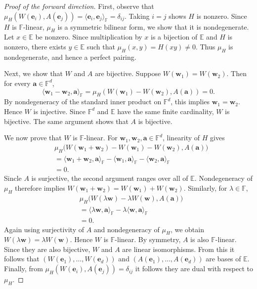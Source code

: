 \documentclass[11pt,letterpaper,usenames,dvipsnames]{article}
\begin{document}
\begin{proof}[Proof of the forward direction]
First, observe that $
\mu_H(W(\mathbf e_i),A(\mathbf e_j))
= \langle \mathbf e_i,\mathbf e_j\rangle_{\mathbb F}
= \delta_{ij}
$. Taking $i=j$ shows $H$ is nonzero. Since $H$ is $\mathbb{F}$-linear, $\mu_H$ is a symmetric bilinear form, we show that it is nondegenerate. Let $x\in\mathbb E$ be nonzero. Since multiplication by $x$ is a bijection of $\mathbb E$ and $H$ is nonzero, there exists $y\in\mathbb E$ such that $\mu_H(x,y)=H(xy)\neq 0$. Thus $\mu_H$ is nondegenerate, and hence a perfect pairing.

Next, we show that $W$ and $A$ are bijective. Suppose
$W(\mathbf w_1)=W(\mathbf w_2)$. Then for every
$\mathbf a\in\mathbb F^d$,
\[
\langle \mathbf w_1-\mathbf w_2,\mathbf a\rangle_{\mathbb F}
= \mu_H(W(\mathbf w_1) - W(\mathbf w_2), A(\mathbf a))
=0.
\]
By nondegeneracy of the standard inner product on $\mathbb F^d$, this
implies $\mathbf w_1=\mathbf w_2$. Hence $W$ is injective. Since
$\mathbb F^d$ and $\mathbb E$ have the same finite cardinality, $W$ is
bijective. The same argument shows that $A$ is bijective.

We now prove that $W$ is $\mathbb F$-linear. For
$\mathbf w_1,\mathbf w_2,\mathbf a\in\mathbb F^d$, linearity of $H$
gives
\[
\begin{aligned}
&\mu_H\bigl(
W(\mathbf w_1+\mathbf w_2)-W(\mathbf w_1)-W(\mathbf w_2),
A(\mathbf a)
\bigr)\\
&=
\langle \mathbf w_1+\mathbf w_2,\mathbf a\rangle_{\mathbb F}
-
\langle \mathbf w_1,\mathbf a\rangle_{\mathbb F}
-
\langle \mathbf w_2,\mathbf a\rangle_{\mathbb F}\\
&=0.
\end{aligned}
\]
Sincle $A$ is surjective, the second argument ranges over all of
$\mathbb E$. Nondegeneracy of $\mu_H$ therefore implies
$W(\mathbf w_1+\mathbf w_2) = W(\mathbf w_1)+W(\mathbf w_2)$. Similarly, for $\lambda\in\mathbb F$,
\[
\begin{aligned}
&\mu_H\bigl(
W(\lambda\mathbf w)-\lambda W(\mathbf w),
A(\mathbf a)
\bigr)\\
&=
\langle \lambda\mathbf w,\mathbf a\rangle_{\mathbb F}
-
\lambda\langle \mathbf w,\mathbf a\rangle_{\mathbb F}\\
&=0.
\end{aligned}
\]
Again using surjectivity of $A$ and nondegeneracy of $\mu_H$, we obtain $W(\lambda\mathbf w)=\lambda W(\mathbf w)$. Hence $W$ is $\mathbb F$-linear. By symmetry, $A$ is also
$\mathbb F$-linear. Since they are also bijective, $W$ and $A$ are linear isomorphisms. From this it follows that $\left(W(\mathbf e_1),\ldots,W(\mathbf e_d)\right)$ and $
\left(A(\mathbf e_1),\ldots,A(\mathbf e_d)\right)$ are bases of $\mathbb E$. Finally, from $\mu_H(W(\mathbf e_i),A(\mathbf e_j)) = \delta_{ij}$ it follows they are dual with respect to $\mu_H$.
\end{proof}
\end{document}
